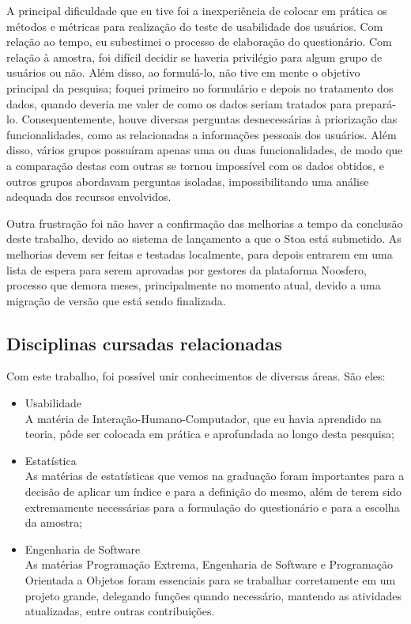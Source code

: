     A principal dificuldade que eu tive foi a inexperiência de colocar em prática os métodos e métricas para realização do teste de usabilidade dos usuários. Com relação ao tempo, eu subestimei o processo de elaboração do questionário. Com relação à amostra, foi difícil decidir se haveria privilégio para algum grupo de usuários ou não. Além disso, ao formulá-lo, não tive em mente o objetivo principal da pesquisa; foquei primeiro no formulário e depois no tratamento dos dados, quando deveria me valer de como os dados seriam tratados para prepará-lo. Consequentemente, houve diversas perguntas desnecessárias à priorização das funcionalidades, como as relacionadas a informações pessoais dos usuários. Além disso, vários grupos possuíram apenas uma ou duas funcionalidades, de modo que a comparação destas com outras se tornou impossível com os dados obtidos, e outros grupos abordavam perguntas isoladas, impossibilitando uma análise adequada dos recursos envolvidos.
    
    Outra frustração foi não haver a confirmação das melhorias a tempo da conclusão deste trabalho, devido ao sistema de lançamento a que o Stoa está submetido. As melhorias devem ser feitas e testadas localmente, para depois entrarem em uma lista de espera para serem aprovadas por gestores da plataforma Noosfero, processo que demora meses, principalmente no momento atual, devido a uma migração de versão que está sendo finalizada.

\subsection{Disciplinas cursadas relacionadas}

    Com este trabalho, foi possível unir conhecimentos de diversas áreas. São eles:
    \begin{itemize}
    \item Usabilidade\\
    A matéria de Interação-Humano-Computador, que eu havia aprendido na teoria, pôde ser colocada em prática e aprofundada ao longo desta pesquisa;
    \item Estatística\\
    As matérias de estatísticas que vemos na graduação foram importantes para a decisão de aplicar um índice e para a definição do mesmo, além de terem sido extremamente necessárias para a formulação do questionário e para a escolha da amostra;
    \item Engenharia de Software\\
    As matérias Programação Extrema, Engenharia de Software e Programação Orientada a Objetos foram essenciais para se trabalhar corretamente em um projeto grande, delegando funções quando necessário, mantendo as atividades atualizadas, entre outras contribuições.
    \end{itemize} 

